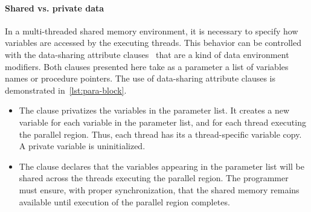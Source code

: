 \paragraph*{Shared vs. private data}
In a multi-threaded shared memory environment, it is necessary to specify how variables are accessed by the executing threads.
This behavior can be controlled with the data-sharing attribute clauses~\cite[p. 224--225]{openmp_api} that are a kind of data environment modifiers.
Both clauses presented here take as a parameter a list of variables names or procedure pointers.
The use of data-sharing attribute clauses is demonstrated in~\autoref{lst:para-block}.

\begin{itemize}

\item The  clause privatizes the variables in the parameter list.
It creates a new variable for each variable in the parameter list, and for each thread executing the parallel region.
Thus, each thread has its a thread-specific variable copy.
A private variable is uninitialized.

\item The  clause declares that the variables appearing in the parameter list will be shared across the threads executing the parallel region.
The programmer must ensure, with proper synchronization, that the shared memory remains available until execution of the parallel region completes.

\end{itemize}

